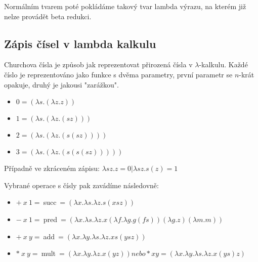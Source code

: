 \documentclass{szzclass}
\begin{document}
Normálním tvarem poté pokládáme takový tvar lambda výrazu, na kterém již nelze provádět beta redukci.

\subsection{Zápis čísel v lambda kalkulu}

Churchova čísla je způsob jak reprezentovat přirozená čísla v $\lambda$-kalkulu. Každé číslo je reprezentováno jako funkce s dvěma parametry, první parametr se  $n$-krát opakuje, druhý je jakousi "zarážkou".

\begin{itemize}
    \item $0 = (\lambda s.(\lambda z.z))$
    \item $1 = (\lambda s.(\lambda z. (s z)))$
    \item $2 = (\lambda s.(\lambda z. (s (s z))))$
    \item $3 = (\lambda s.(\lambda z. (s (s (s z)))))$
\end{itemize}

Případně ve zkráceném zápisu: $\lambda sz.z = 0 | \lambda sz. s(z) = 1$

Vybrané operace s čísly pak zavádíme následovně:
\begin{itemize}
    \item $+~x~1 =~$succ$~= (\lambda x. \lambda s. \lambda z. s (x s z))$
    \item $-~x~1 =~$pred$~= (\lambda x. \lambda s. \lambda z. x (\lambda f. \lambda g.g (f s)) (\lambda g.z) (\lambda m.m))$
    \item $+~x~y =~$add$~= (\lambda x. \lambda y. \lambda s. \lambda z. x s (y s z))$
    \item $*~x~y =~$mult$~= (\lambda x. \lambda y. \lambda z. x (y z)) nebo * x y = (\lambda x. \lambda y. \lambda s. \lambda z. x (y s) z)$
\end{itemize}
\end{document}
